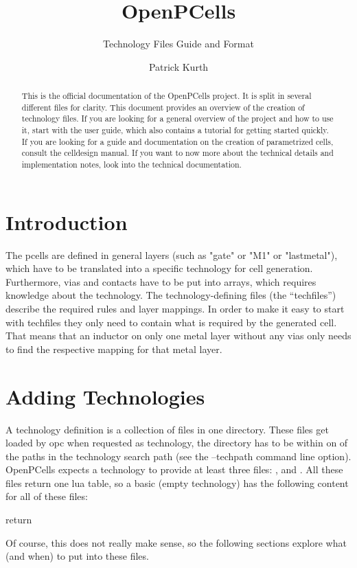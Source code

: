 

\title{OpenPCells}
\subtitle{Technology Files Guide and Format}
\author{Patrick Kurth}


\maketitle
\begin{abstract}
    \noindent This is the official documentation of the OpenPCells project. It is split in several different files for clarity. 
    This document provides an overview of the creation of technology files.
    If you are looking for a general overview of the project and how to use it, start with the user guide, which also contains a tutorial for getting started quickly. 
    If you are looking for a guide and documentation on the creation of parametrized cells, consult the celldesign manual.
    If you want to now more about the technical details and implementation notes, look into the technical documentation.
\end{abstract}

\section{Introduction}

The pcells are defined in general layers (such as "gate" or "M1" or "lastmetal"), which have to be translated into a specific technology for cell generation.
Furthermore, vias and contacts have to be put into arrays, which requires knowledge about the technology.
The technology-defining files (the \enquote{techfiles}) describe the required rules and layer mappings.
In order to make it easy to start with techfiles they only need to contain what is required by the generated cell.
That means that an inductor on only one metal layer without any vias only needs to find the respective mapping for that metal layer.

\section{Adding Technologies}
A technology definition is a collection of files in one directory.
These files get loaded by opc when requested as technology, the directory has to be within on of the paths in the technology search path (see the --techpath command line option).
OpenPCells expects a technology to provide at least three files: ,  and .
All these files return one lua table, so a basic (empty technology) has the following content for all of these files:
\begin{lualisting}
    return {}
\end{lualisting}
Of course, this does not really make sense, so the following sections explore what (and when) to put into these files.

